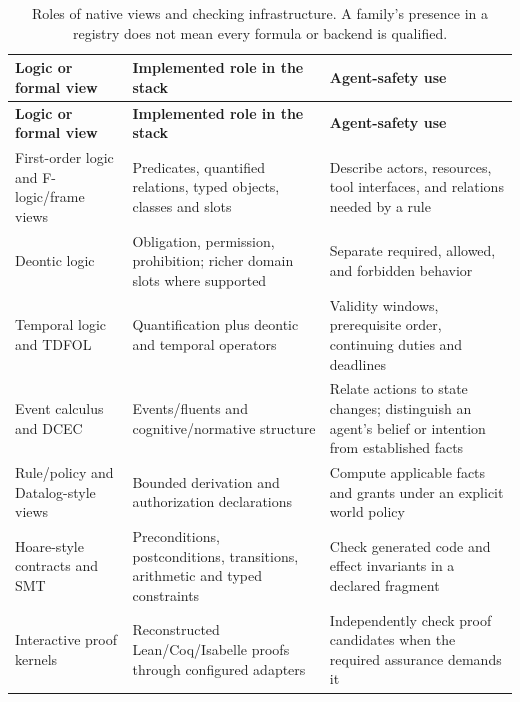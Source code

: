 \begingroup
\renewcommand{\thetable}{2}
\begin{longtable}{@{}>{\raggedright\arraybackslash}p{.24\linewidth} >{\raggedright\arraybackslash}p{.32\linewidth} >{\raggedright\arraybackslash}p{.38\linewidth}@{}}
\caption{Roles of native views and checking infrastructure. A family's presence in a registry does not mean every formula or backend is qualified.}\label{tab:2}\\
\toprule
\textbf{Logic or formal view} & \textbf{Implemented role in the stack} & \textbf{Agent-safety use} \\
\midrule
\endfirsthead
\textbf{Logic or formal view} & \textbf{Implemented role in the stack} & \textbf{Agent-safety use} \\
\midrule
\endhead
\bottomrule
\endlastfoot
First-order logic and F-logic/frame views & Predicates, quantified relations, typed objects, classes and slots & Describe actors, resources, tool interfaces, and relations needed by a rule \\[3pt]
Deontic logic & Obligation, permission, prohibition; richer domain slots where supported & Separate required, allowed, and forbidden behavior \\[3pt]
Temporal logic and TDFOL & Quantification plus deontic and temporal operators & Validity windows, prerequisite order, continuing duties and deadlines \\[3pt]
Event calculus and DCEC & Events/fluents and cognitive/normative structure & Relate actions to state changes; distinguish an agent's belief or intention from established facts \\[3pt]
Rule/policy and Datalog-style views & Bounded derivation and authorization declarations & Compute applicable facts and grants under an explicit world policy \\[3pt]
Hoare-style contracts and SMT & Preconditions, postconditions, transitions, arithmetic and typed constraints & Check generated code and effect invariants in a declared fragment \\[3pt]
Interactive proof kernels & Reconstructed Lean/Coq/Isabelle proofs through configured adapters & Independently check proof candidates when the required assurance demands it \\[3pt]
\end{longtable}
\endgroup
